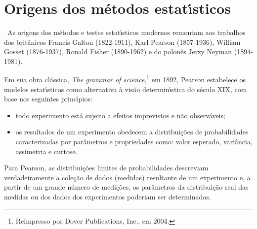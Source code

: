 \section{Origens dos  m\'{e}todos estat\'{\i}sticos}\label{Erros}

\paragraph*{}
\ As origens dos m\'{e}todos e testes estat\'{\i}sticos modernos remontam aos trabalhos dos brit\^{a}nicos  Francis Galton  (1822-1911), Karl Pearson (1857-1936), William Gosset (1876-1937), Ronald Fisher (1890-1962)  e do polon\^{e}s Jerzy Neyman (1894-1981).

Em sua obra cl\'{a}ssica, {\it The grammar of science},\footnote{Reimpresso  por   Dover Publications, Inc., em  2004.} em 1892,  Pearson estabelece  os modelos estat\'{\i}sticos como alternativa \`{a} vis\~{a}o determin\'{\i}stica do s\'{e}culo XIX, com base nos seguintes princ\'{\i}pios:

\begin{itemize}
\item  todo experimento est\'{a} sujeito a efeitos imprevistos e n\~{a}o observ\'{a}veis;
\item  os resultados de um experimento obedecem a distribui\c{c}\~{o}es de probabilidades caracterizadas por  par\^{a}metros e propriedades como: valor esperado, vari\^{a}ncia, assimetria e curtose.
\end{itemize}

Para Pearson, as distribui\c{c}\~{o}es limites de pro\-ba\-bi\-li\-da\-des des\-cre\-viam ver\-da\-dei\-ra\-men\-te a cole\c{c}\~{a}o de dados (medidas)  resultante de  um experimento e,  a partir de um grande n\'{u}mero de medi\c{c}\~{o}es, os par\^{a}metros da distribui\c{c}\~{a}o real das medidas ou dos dados dos experimentos poderiam ser determinados.

